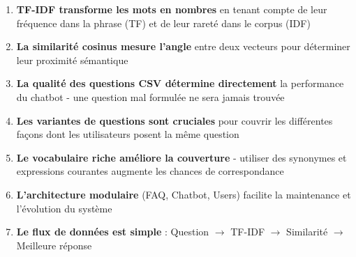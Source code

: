\documentclass[11pt,a4paper]{article}
\begin{document}
\begin{important}
\begin{enumerate}
    \item \textbf{TF-IDF transforme les mots en nombres} en tenant compte de leur fréquence dans la phrase (TF) et de leur rareté dans le corpus (IDF)
    
    \item \textbf{La similarité cosinus mesure l'angle} entre deux vecteurs pour déterminer leur proximité sémantique
    
    \item \textbf{La qualité des questions CSV détermine directement} la performance du chatbot - une question mal formulée ne sera jamais trouvée
    
    \item \textbf{Les variantes de questions sont cruciales} pour couvrir les différentes façons dont les utilisateurs posent la même question
    
    \item \textbf{Le vocabulaire riche améliore la couverture} - utiliser des synonymes et expressions courantes augmente les chances de correspondance
    
    \item \textbf{L'architecture modulaire} (FAQ, Chatbot, Users) facilite la maintenance et l'évolution du système
    
    \item \textbf{Le flux de données est simple} : Question $\rightarrow$ TF-IDF $\rightarrow$ Similarité $\rightarrow$ Meilleure réponse
\end{enumerate}
\end{important}
\end{document}
